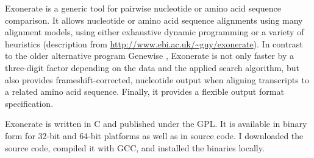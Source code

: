 Exonerate \citep{slater2005} is a generic tool for pairwise nucleotide or amino
acid sequence comparison.  It allows nucleotide or amino acid sequence
alignments using many alignment models, using either exhaustive dynamic
programming or a variety of heuristics (description from
\url{http://www.ebi.ac.uk/~guy/exonerate}). In contrast to the older alternative
program Genewise \citep{birney2004}, Exonerate is not only faster by a
three-digit factor depending on the data and the applied search algorithm, but
also provides frameshift-corrected, nucleotide output when aligning transcripts
to a related amino acid sequence. Finally, it provides a flexible output format
specification.

Exonerate is written in C and published under the GPL. It is available in binary
form for 32-bit and 64-bit platforms as well as in source code. I downloaded the
source code, compiled it with GCC, and installed the binaries locally.
